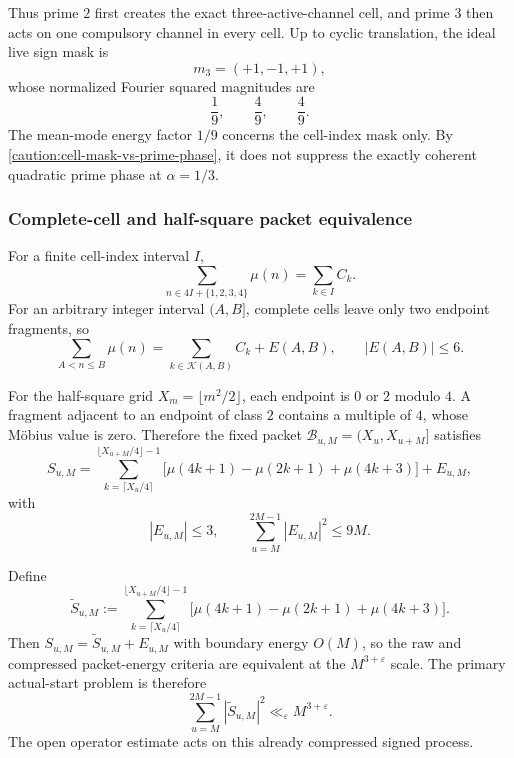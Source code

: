 \documentclass[11pt]{article}
\theoremstyle{definition}
\theoremstyle{remark}
\newcommand{\eps}{\varepsilon}
\newcommand{\1}{\mathbf{1}}
\begin{document}
Thus prime $2$ first creates the exact three-active-channel cell, and prime $3$
then acts on one compulsory channel in every cell.  Up to cyclic translation, the
ideal live sign mask is
\[
 m_3=(+1,-1,+1),
\]
whose normalized Fourier squared magnitudes are
\begin{equation}
 \frac19,\qquad\frac49,\qquad\frac49.
 \label{eq:p3-cell-fourier-masses}
\end{equation}
The mean-mode energy factor $1/9$ concerns the cell-index mask only.  By
\cref{caution:cell-mask-vs-prime-phase}, it does not suppress the exactly coherent
quadratic prime phase at $\alpha=1/3$.

\subsubsection{Complete-cell and half-square packet equivalence}

For a finite cell-index interval $I$,
\begin{equation}
 \boxed{
 \sum_{n\in4I+\{1,2,3,4\}}\mu(n)
 =\sum_{k\in I}C_k.
 }
 \label{eq:complete-cell-packet-identity}
\end{equation}
For an arbitrary integer interval $(A,B]$, complete cells leave only two endpoint
fragments, so
\begin{equation}
 \sum_{A<n\le B}\mu(n)
 =\sum_{k\in\mathcal K(A,B)}C_k+E(A,B),
 \qquad |E(A,B)|\le6.
 \label{eq:arbitrary-cell-packet}
\end{equation}

For the half-square grid $X_m=\lfloor m^2/2\rfloor$, each endpoint is $0$ or $2$
modulo $4$.  A fragment adjacent to an endpoint of class $2$ contains a multiple of
$4$, whose M\"obius value is zero.  Therefore the fixed packet
$\mathcal B_{u,M}=(X_u,X_{u+M}]$ satisfies
\begin{equation}
 \boxed{
 S_{u,M}
 =\sum_{k=\lceil X_u/4\rceil}^{\lfloor X_{u+M}/4\rfloor-1}
 \bigl[\mu(4k+1)-\mu(2k+1)+\mu(4k+3)\bigr]
 +E_{u,M},
 }
 \label{eq:half-square-compressed-packet}
\end{equation}
with
\begin{equation}
 \boxed{|E_{u,M}|\le3,
 \qquad
 \sum_{u=M}^{2M-1}|E_{u,M}|^2\le9M.}
 \label{eq:half-square-boundary-energy}
\end{equation}

Define
\begin{equation}
 \widetilde S_{u,M}
 :=\sum_{k=\lceil X_u/4\rceil}^{\lfloor X_{u+M}/4\rfloor-1}
 \bigl[\mu(4k+1)-\mu(2k+1)+\mu(4k+3)\bigr].
 \label{eq:compressed-packet-state}
\end{equation}
Then $S_{u,M}=\widetilde S_{u,M}+E_{u,M}$ with boundary energy $O(M)$, so the
raw and compressed packet-energy criteria are equivalent at the
$M^{3+\eps}$ scale.  The primary actual-start problem is therefore
\begin{equation}
 \boxed{
 \sum_{u=M}^{2M-1}|\widetilde S_{u,M}|^2
 \ll_\eps M^{3+\eps}.
 }
 \label{eq:compressed-master-variance}
\end{equation}
The open operator estimate acts on this already compressed signed process.
\end{document}
